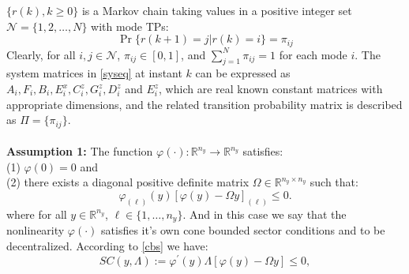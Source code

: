 \documentclass[conference]{IEEEtran}
\begin{document}
$\{r(k),k\geq0\}$ is a Markov chain taking values in a positive integer set $\mathcal{N}=\{1,2,\dots,N\}$ with mode TPs:
\begin{equation}
	\Pr\{r(k+1)=j|r(k)=i\}=\pi_{ij}
\end{equation}
Clearly, for all $i,j\in\mathcal{N}$, $\pi_{ij}\in[0,1]$, and $\sum_{j=1}^{N}\pi_{ij}=1$ for each mode $i$. The system matrices in \eqref{syseq} at instant $k$ can be expressed as $A_i,F_i,B_i,E^x_i,C^z_i,G^z_i,D^z_i$ and $E^z_i$, which are real known constant matrices with appropriate dimensions, and the related transition probability matrix is described as $\mathit{\Pi}=\{\pi_{ij}\}$.\\
\\
\textbf{Assumption 1:} The function $\varphi(\cdot): \mathbb{R}^{n_y}\rightarrow\mathbb{R}^{n_y}$ satisfies:\\ 
(1) $\varphi(0)=0$ and \\
(2) there exists a diagonal positive definite matrix $\varOmega \in\mathbb{R}^{n_y\times n_y}$ such that: 
\begin{equation}\label{cbs}
\varphi_{(\ell)}(y)[\varphi(y)-\varOmega y ]_{(\ell)}\leq 0.
\end{equation}
where for all $y\in\mathbb{R}^{n_y}$, $\ell \in\{1,\dots,n_y\}$. And in this case we say that the nonlinearity $\varphi(\cdot) $ satisfies it's own cone bounded sector conditions and to be decentralized. According to \eqref{cbs} we have:
\begin{equation}\label{scieq}
	SC(y,\varLambda):= \varphi^{\mathrm{'}}(y)\varLambda[\varphi(y)-\varOmega y]\leq0,
\end{equation}
\end{document}
